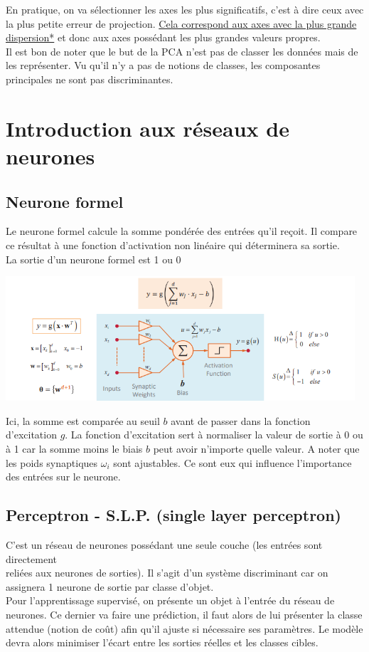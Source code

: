 \documentclass[a4paper,12pt,oneside]{report}	%
\begin{document}
        En pratique, on va sélectionner les axes les plus significatifs, c'est à dire ceux avec la plus petite erreur de projection. \hyperlink{https://youtu.be/FgakZw6K1QQ?si=-eel9SYpv7jVf3en&t=303}{Cela correspond aux axes avec la plus grande dispersion*} et donc aux axes possédant les plus grandes valeurs propres.\\
        Il est bon de noter que le but de la PCA n'est pas de classer les données mais de les représenter. Vu qu'il n'y a pas de notions de classes, les composantes principales ne sont pas discriminantes.
\chapter{Introduction aux réseaux de neurones}
    \section{Neurone formel}
        Le neurone formel calcule la somme pondérée des entrées qu'il reçoit. Il compare ce résultat à une fonction d'activation non linéaire qui déterminera sa sortie. \\ 
        \colorbox{bright-blue}{La sortie d'un neurone formel est 1 ou 0}
        \begin{center}
            \includegraphics[width=13cm]{LaTeX/pictures/3.1.1_1.png}
        \end{center}
        Ici, la somme est comparée au seuil $b$ avant de passer dans la fonction d'excitation $g$. La fonction d'excitation sert à normaliser la valeur de sortie à 0 ou à 1 car la somme moins le biais $b$ peut avoir n'importe quelle valeur. A noter que les poids synaptiques $\omega_i$ sont ajustables. Ce sont eux qui influence l'importance des entrées sur le neurone.
    \section{Perceptron - S.L.P. (single layer perceptron)}
        \colorbox{bright-blue}{C'est un réseau de neurones possédant une seule couche (les entrées sont directement}\\ \colorbox{bright-blue}{reliées aux neurones de sorties).}
        Il s'agit d'un système discriminant car on assignera 1 neurone de sortie par classe d'objet.\\
        Pour l'apprentissage supervisé, on présente un objet à l'entrée du réseau de neurones. Ce dernier va faire une prédiction, il faut alors de lui présenter la classe attendue (notion de coût) afin qu'il ajuste si nécessaire ses paramètres. Le modèle devra alors minimiser l'écart entre les sorties réelles et les classes cibles.
\end{document}

